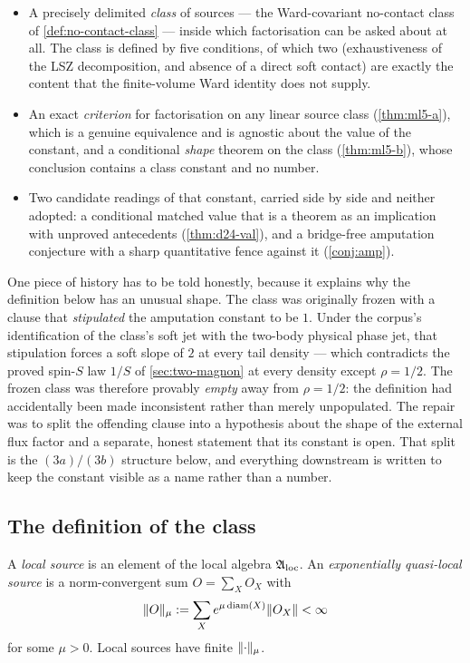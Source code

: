 \begin{itemize}
\item A precisely delimited \emph{class} of sources --- the Ward-covariant
  no-contact class of \cref{def:no-contact-class} --- inside which
  factorisation can be asked about at all. The class is defined by five
  conditions, of which two (exhaustiveness of the LSZ decomposition, and
  absence of a direct soft contact) are exactly the content that the
  finite-volume Ward identity does not supply.
\item An exact \emph{criterion} for factorisation on any linear source class
  (\cref{thm:ml5-a}), which is a genuine equivalence and is agnostic about the
  value of the constant, and a conditional \emph{shape} theorem on the class
  (\cref{thm:ml5-b}), whose conclusion contains a class constant and no number.
\item Two candidate readings of that constant, carried side by side and
  neither adopted: a conditional matched value that is a theorem as an
  implication with unproved antecedents (\cref{thm:d24-val}), and a
  bridge-free amputation conjecture with a sharp quantitative fence against it
  (\cref{conj:amp}).
\end{itemize}

One piece of history has to be told honestly, because it explains why the
definition below has an unusual shape. The class was originally frozen with a
clause that \emph{stipulated} the amputation constant to be $1$. Under the
corpus's identification of the class's soft jet with the two-body physical
phase jet, that stipulation forces a soft slope of $2$ at every tail density
--- which contradicts the proved spin-$S$ law $1/S$ of \cref{sec:two-magnon} at
every density except $\rho=1/2$. The frozen class was therefore provably
\emph{empty} away from $\rho=1/2$: the definition had accidentally been made
inconsistent rather than merely unpopulated. The repair was to split the
offending clause into a hypothesis about the shape of the external flux factor
and a separate, honest statement that its constant is open. That split is the
$(3a)/(3b)$ structure below, and everything downstream is written to keep the
constant visible as a name rather than a number.

\subsection{The definition of the class}

\begin{definition}
\label{def:hard-sources}
A \emph{local source} is an element of the local algebra $\mathfrak{A}_{\rm loc}$. An
\emph{exponentially quasi-local source} is a norm-convergent sum
$O=\sum_XO_X$ with
\begin{equation}
  \lVert O\rVert_\mu:=\sum_X e^{\mu\,\mathrm{diam}(X)}\lVert O_X\rVert<\infty
  \label{eq:quasilocal-norm}
\end{equation}
for some $\mu>0$. Local sources have finite $\lVert \cdot\rVert_\mu$.
\end{definition}

